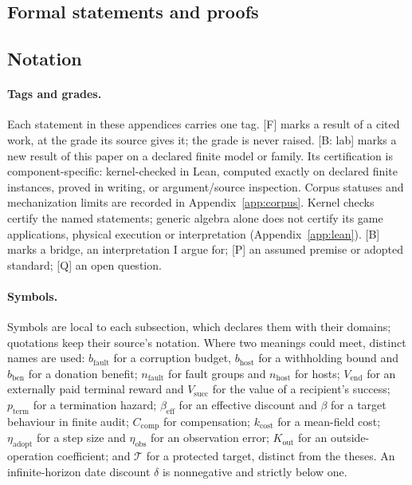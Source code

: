 \documentclass[pdflatex,sn-basic]{sn-jnl}%
\newcommand{\slot}[1]{}%
\begin{document}
\begin{appendices}
\section{Formal statements and proofs}\label{app:formal}
\setcounter{subsection}{-1}%
\subsection{Notation}\label{app:notation}

\slot{A.0}
\paragraph{Tags and grades.} Each statement in these appendices carries one tag. [F] marks a result of a cited work, at the grade its source gives it; the grade is never raised. [B: lab] marks a new result of this paper on a declared finite model or family. Its certification is component-specific: kernel-checked in Lean, computed exactly on declared finite instances, proved in writing, or argument/source inspection. Corpus statuses and mechanization limits are recorded in Appendix~\ref{app:corpus}. Kernel checks certify the named statements; generic algebra alone does not certify its game applications, physical execution or interpretation (Appendix~\ref{app:lean}). [B] marks a bridge, an interpretation I argue for; [P] an assumed premise or adopted standard; [Q] an open question.

\paragraph{Symbols.} Symbols are local to each subsection, which declares them with their domains; quotations keep their source's notation. Where two meanings could meet, distinct names are used: $b_{\mathrm{fault}}$ for a corruption budget, $b_{\mathrm{host}}$ for a withholding bound and $b_{\mathrm{ben}}$ for a donation benefit; $n_{\mathrm{fault}}$ for fault groups and $n_{\mathrm{host}}$ for hosts; $V_{\mathrm{end}}$ for an externally paid terminal reward and $V_{\mathrm{succ}}$ for the value of a recipient's success; $p_{\mathrm{term}}$ for a termination hazard; $\beta_{\mathrm{eff}}$ for an effective discount and $\beta$ for a target behaviour in finite audit; $C_{\mathrm{comp}}$ for compensation; $k_{\mathrm{cost}}$ for a mean-field cost; $\eta_{\mathrm{adopt}}$ for a step size and $\eta_{\mathrm{obs}}$ for an observation error; $K_{\mathrm{out}}$ for an outside-operation coefficient; and $\mathcal{T}$ for a protected target, distinct from the theses. An infinite-horizon date discount $\delta$ is nonnegative and strictly below one.

\end{appendices}
\end{document}
